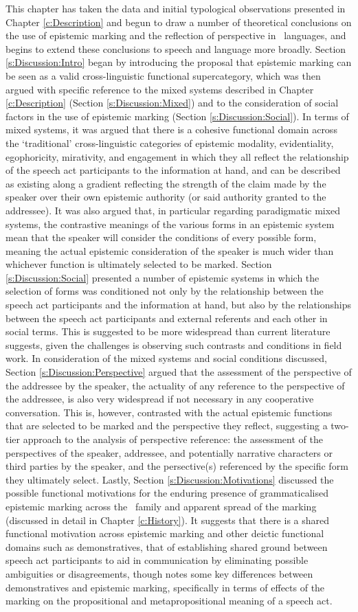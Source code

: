 This chapter has taken the data and initial typological observations presented in Chapter \ref{c:Description} and begun to draw a number of theoretical conclusions on the use of epistemic marking and the reflection of perspective in \lfam\ languages, and begins to extend these conclusions to speech and language more broadly. Section \ref{s:Discussion:Intro} began by introducing the proposal that epistemic marking can be seen as a valid cross-linguistic functional supercategory, which was then argued with specific reference to the mixed systems described in Chapter \ref{c:Description} (Section \ref{s:Discussion:Mixed}) and to the consideration of social factors in the use of epistemic marking (Section \ref{s:Discussion:Social}). In terms of mixed systems, it was argued that there is a cohesive functional domain across the `traditional' cross-linguistic categories of epistemic modality, evidentiality, egophoricity, mirativity, and engagement in which they all reflect the relationship of the speech act participants to the information at hand, and can be described as existing along a gradient reflecting the strength of the claim made by the speaker over their own epistemic authority (or said authority granted to the addressee). It was also argued that, in particular regarding paradigmatic mixed systems, the contrastive meanings of the various forms in an epistemic system mean that the speaker will consider the conditions of every possible form, meaning the actual epistemic consideration of the speaker is much wider than whichever function is ultimately selected to be marked. Section \ref{s:Discussion:Social} presented a number of epistemic systems in which the selection of forms was conditioned not only by the relationship between the speech act participants and the information at hand, but also by the relationships between the speech act participants and external referents and each other in social terms. This is suggested to be more widespread than current literature suggests, given the challenges is observing such contrasts and conditions in field work. In consideration of the mixed systems and social conditions discussed, Section \ref{s:Discussion:Perspective} argued that the assessment of the perspective of the addressee by the speaker, the actuality of any reference to the perspective of the addressee, is also very widespread if not necessary in any cooperative conversation. This is, however, contrasted with the actual epistemic functions that are selected to be marked and the perspective they reflect, suggesting a two-tier approach to the analysis of perspective reference: the assessment of the perspectives of the speaker, addressee, and potentially narrative characters or third parties by the speaker, and the persective(s) referenced by the specific form they ultimately select. Lastly, Section \ref{s:Discussion:Motivations} discussed the possible functional motivations for the enduring presence of grammaticalised epistemic marking across the \lfam\ family and apparent spread of the marking (discussed in detail in Chapter \ref{c:History}). It suggests that there is a shared functional motivation across epistemic marking and other deictic functional domains such as demonstratives, that of establishing shared ground between speech act participants to aid in communication by eliminating possible ambiguities or disagreements, though notes some key differences between demonstratives and epistemic marking, specifically in terms of effects of the marking on the propositional and metapropositional meaning of a speech act.